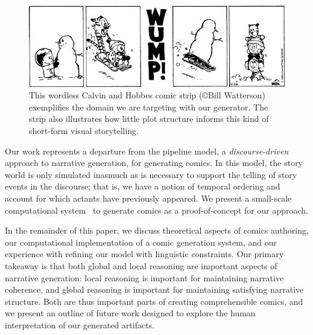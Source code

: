 \begin{figure}
\includegraphics[width=\columnwidth]{calvin-and-hobbes.png}
\caption{
This wordless Calvin and Hobbes comic strip (\copyright Bill Watterson)
exemplifies the domain we are targeting with our generator. The strip also
illustrates how little plot structure informs this kind of short-form visual
storytelling.
}
\label{fig:calvin}
\end{figure}

Our work represents a departure from the pipeline model, a
\emph{discourse-driven} approach to narrative generation, for generating
comics. In this model, the story world is only simulated inasmuch as is
necessary to support the telling of story events in the discourse; that is,
we have a notion of temporal ordering and account for which actants have
previously appeared. We present a small-scale computational
system~\cite{montfort2012small} to generate comics as a proof-of-concept
for our approach.

In the remainder of this paper, we discuss theoretical aspects of comics
authoring, our computational implementation of a comic generation system,
and our experience with refining our model with linguistic constraints. Our
primary takeaway is that both global and local reasoning are important
aspects of narrative generation: local reasoning is important for
maintaining narrative coherence, and global reasoning is important for
maintaining satisfying narrative structure. Both are thus important parts
of creating comprehensible comics, and we present an outline of future work
designed to explore the human interpretation of our generated artifacts.

